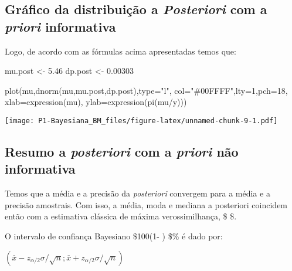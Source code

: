 \documentclass[
]{article}
\newenvironment{Shaded}{\begin{snugshade}}{\end{snugshade}}
\newcommand{\AttributeTok}[1]{\textcolor[rgb]{0.77,0.63,0.00}{#1}}
\newcommand{\DecValTok}[1]{\textcolor[rgb]{0.00,0.00,0.81}{#1}}
\newcommand{\FloatTok}[1]{\textcolor[rgb]{0.00,0.00,0.81}{#1}}
\newcommand{\FunctionTok}[1]{\textcolor[rgb]{0.00,0.00,0.00}{#1}}
\newcommand{\NormalTok}[1]{#1}
\newcommand{\OtherTok}[1]{\textcolor[rgb]{0.56,0.35,0.01}{#1}}
\newcommand{\SpecialCharTok}[1]{\textcolor[rgb]{0.00,0.00,0.00}{#1}}
\newcommand{\StringTok}[1]{\textcolor[rgb]{0.31,0.60,0.02}{#1}}
\begin{document}
\hypertarget{gruxe1fico-da-distribuiuxe7uxe3o-a-posteriori-com-a-priori-informativa}{%
\subsection{\texorpdfstring{Gráfico da distribuição a \emph{Posteriori}
com a \emph{priori}
informativa}{Gráfico da distribuição a Posteriori com a priori informativa}}\label{gruxe1fico-da-distribuiuxe7uxe3o-a-posteriori-com-a-priori-informativa}}

Logo, de acordo com as fórmulas acima apresentadas temos que:

\begin{Shaded}
\begin{Highlighting}[]
\NormalTok{mu.post }\OtherTok{\textless{}{-}} \FloatTok{5.46}
\NormalTok{dp.post }\OtherTok{\textless{}{-}} \FloatTok{0.00303}

\FunctionTok{plot}\NormalTok{(mu,}\FunctionTok{dnorm}\NormalTok{(mu,mu.post,dp.post),}\AttributeTok{type=}\StringTok{"l"}\NormalTok{,}
     \AttributeTok{col=}\StringTok{"\#00FFFF"}\NormalTok{,}\AttributeTok{lty=}\DecValTok{1}\NormalTok{,}\AttributeTok{pch=}\DecValTok{18}\NormalTok{,   }
     \AttributeTok{xlab=}\FunctionTok{expression}\NormalTok{(mu),}
     \AttributeTok{ylab=}\FunctionTok{expression}\NormalTok{(}\FunctionTok{pi}\NormalTok{(mu}\SpecialCharTok{/}\NormalTok{y)))}
\end{Highlighting}
\end{Shaded}

\texttt{[image: P1-Bayesiana\_BM\_files/figure-latex/unnamed-chunk-9-1.pdf]}

\hypertarget{resumo-a-posteriori-com-a-priori-nuxe3o-informativa}{%
\subsection{\texorpdfstring{Resumo a \emph{posteriori} com a
\emph{priori} não
informativa}{Resumo a posteriori com a priori não informativa}}\label{resumo-a-posteriori-com-a-priori-nuxe3o-informativa}}

Temos que a média e a precisão da \emph{posteriori} convergem para a
média e a precisão amostrais. Com isso, a média, moda e mediana a
posteriori coincidem então com a estimativa clássica de máxima
verossimilhança, \$ \$.

O intervalo de confiança Bayesiano \$100(1- \alpha) \$\% é dado por:

\((\overline{x} - z_{\alpha/2} \sigma/\sqrt{n} ; \overline{x} + z_{\alpha/2} \sigma/\sqrt{n})\)
\end{document}
